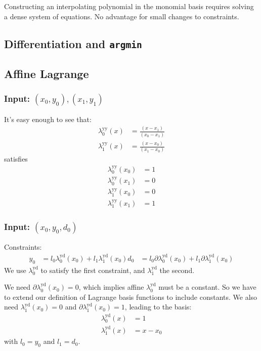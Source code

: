 Constructing an interpolating polynomial in the monomial basis
requires solving a dense system of equations. 
No advantage for small changes to constraints.

\subsection{Differentiation and \texttt{argmin}}

\subsection{Affine Lagrange}

\subsubsection{Input: $(x_0,y_0),(x_1,y_1)$}

It's easy enough to see that:
\begin{align}
\lambda^{\text{yy}}_0(x) & = \frac {(x - x_1)} {(x_0 - x_1)} \\
\lambda^{\text{yy}}_1(x) & = \frac {(x - x_0)} {(x_1 - x_0)} \nonumber
\end{align}
satisfies
\begin{align}
\lambda^{\text{yy}}_0(x_0) & = 1 \\
\lambda^{\text{yy}}_0(x_1) & = 0 \nonumber \\
\lambda^{\text{yy}}_1(x_0) & = 0 \nonumber \\
\lambda^{\text{yy}}_1(x_1) & = 1 \nonumber 
\end{align}


\subsubsection{Input: $(x_0,y_0,d_0)$}

Constraints:
\begin{equation}
\begin{aligned}
y_0 & = l_0 \lambda^{\text{yd}}_0 (x_0) + l_1 \lambda^{\text{yd}}_1 (x_0) 
d_0 & = l_0 \partial\lambda^{\text{yd}}_0 (x_0) + l_1 \partial\lambda^{\text{yd}}_1 (x_0) 
\end{aligned}
\end{equation}
We use $\lambda^{\text{yd}}_0$ to satisfy the first constraint,
and $\lambda^{\text{yd}}_1$ the second.

We need $\partial\lambda^{\text{yd}}_0 (x_0) = 0$,
which implies affine $\lambda^{\text{yd}}_0$ 
must be a constant.
So we have to extend our definition of Lagrange basis functions
to include constants.
We also need $\lambda^{\text{yd}}_1 (x_0) = 0$ and
$\partial\lambda^{\text{yd}}_1 (x_0) = 1$, leading to the basis:
\begin{align}
\lambda^{\text{yd}}_0 (x) & = 1 \\
\lambda^{\text{yd}}_1 (x) & = x - x_0 \nonumber
\end{align}
with $l_0 = y_0$ and $l_1 = d_0$.

